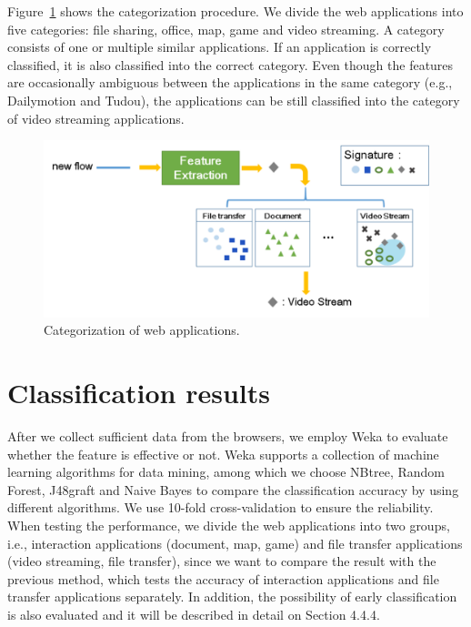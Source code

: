 Figure~\ref{Fig.setlabel} shows the categorization procedure. We divide the web applications into five categories: file sharing, office, map, game and video streaming. A category consists of one or multiple similar applications. If an application is correctly classified, it is also classified into the correct category. Even though the features are occasionally ambiguous between the applications in the same category (e.g., Dailymotion and Tudou), the applications can be still classified into the category of video streaming applications.   

\begin{figure}[H]
\begin{center} 
\includegraphics[width=1.0\textwidth]{setlabel}
\end{center}
\caption{Categorization of web applications.}
\label{Fig.setlabel}
\end{figure}


\section{Classification results}
\label{sec:result}
After we collect sufficient data from the browsers, we employ Weka to evaluate whether the feature is effective or not. Weka supports a collection of machine learning algorithms for data mining, among which we choose NBtree, Random Forest, J48graft and Naive Bayes to compare the classification accuracy by using different algorithms. We use 10-fold cross-validation to ensure the reliability. When testing the performance, we divide the web applications into two groups, i.e., interaction applications (document, map, game) and file transfer applications (video streaming, file transfer), since we want to compare the result with the previous method, which tests the accuracy of interaction applications and file transfer applications separately. In addition, the possibility of early classification is also evaluated and it will be described in detail on Section 4.4.4.

